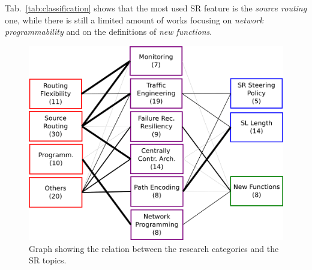Tab.~\ref{tab:classification} shows that the most used SR feature is the \emph{source routing} one, while there is still a limited amount of works focusing on \emph{network programmability} and on the definitions of \emph{new functions}.

\begin{figure}
    \centering
    \includegraphics[width=1\columnwidth]{fig/taxonomy_1-2b.pdf}
    \caption{Graph showing the relation between the research categories and the SR topics.}
    \label{fig:taxonomy12}
\end{figure}

